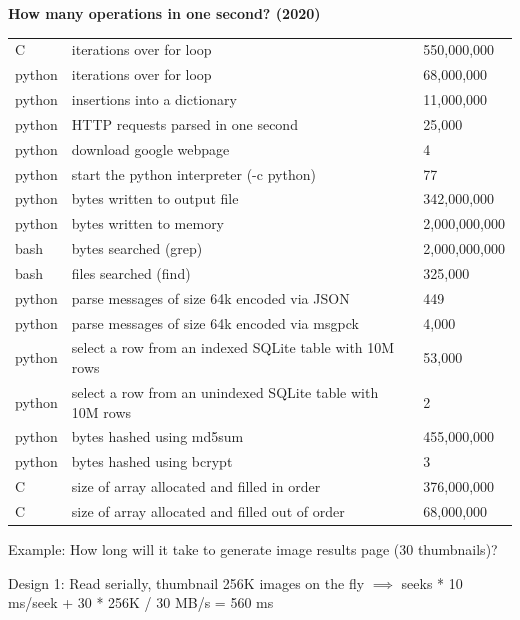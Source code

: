 \documentclass{article}
\begin{document}
    \textbf{How many operations in one second? (2020)}
    \begin{table}[H]
    \begin{tabular}{|l|l|l|}
    \hline
        C  & iterations over for loop & 550,000,000 \\
        python & iterations over for loop & 68,000,000 \\
        python & insertions into a dictionary & 11,000,000 \\
        python & HTTP requests parsed in one second & 25,000 \\
        python & download google webpage & 4 \\
        python & start the python interpreter (-c python) & 77 \\
        python & bytes written to output file  &  342,000,000 \\
        python & bytes written to memory & 2,000,000,000 \\
        bash & bytes searched (grep)  &  2,000,000,000 \\
        bash & files searched (find) & 325,000 \\
        python & parse messages of size 64k encoded via JSON &  449 \\
        python & parse messages of size 64k encoded via msgpck &  4,000 \\
         python & select a row from an indexed SQLite table with 10M rows &  53,000 \\
        python & select a row from an unindexed SQLite table with 10M rows &  2 \\
        python & bytes hashed using md5sum &  455,000,000 \\
        python & bytes hashed using bcrypt & 3 \\
        C & size of array allocated and filled in order & 376,000,000 \\
        C & size of array allocated and filled out of order & 68,000,000 \\
    \hline
    \end{tabular}
    \end{table}
    
    
    Example: How long will it take to generate image results page (30 thumbnails)?
    
    Design 1: Read serially, thumbnail 256K images on the fly $\implies$   seeks * 10 ms/seek + 30 * 256K / 30 MB/s = 560 ms
    
\end{document}

